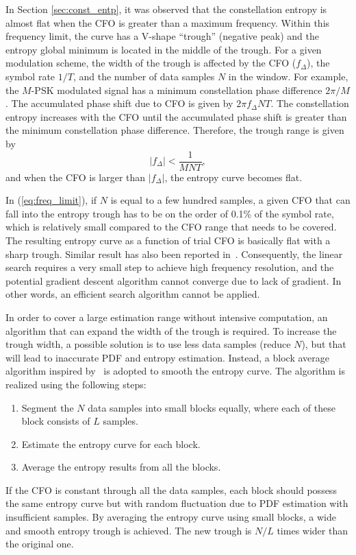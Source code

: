 \documentclass[journal,comsoc]{IEEEtran}
\begin{document}
In Section \ref{sec:const_entp}, it was observed that the constellation entropy is almost flat when the CFO is greater than a maximum frequency.
Within this frequency limit, the curve has a V-shape ``trough'' (negative peak) and the entropy global minimum is located in the middle of the trough.
For a given modulation scheme, the width of the trough is affected by the CFO ($f_\Delta$), the symbol rate $1/T$, and the number of data samples $N$ in the window.
For example, the \(M\)-PSK modulated signal has a minimum constellation phase difference \(2\pi/M\).
The accumulated phase shift due to CFO is given by \(2\pi f_\Delta N T\).
The constellation entropy increases with the CFO until the accumulated phase shift is greater than the minimum constellation phase difference. 
Therefore, the trough range is given by
\begin{equation}
\left| {f_\Delta } \right| < \frac{1}{{MNT}},
\label{eq:freq_limit}
\end{equation}
\noindent and when the CFO is larger than $\left| {f_\Delta } \right|$, the entropy curve becomes flat.


In (\ref{eq:freq_limit}), if \(N\) is equal to a few hundred samples, a given CFO that can fall into the entropy trough has to be on the order of 0.1\% of the symbol rate, which is relatively small compared to the CFO range that needs to be covered.
The resulting entropy curve as a function of trial CFO is basically flat with a sharp trough.
Similar result has also been reported in~\cite{Pedzisz2006}. 
Consequently, the linear search requires a very small step to achieve high frequency resolution, and the potential gradient descent algorithm cannot converge due to lack of gradient.
In other words, an efficient search algorithm cannot be applied. 

In order to cover a large estimation range without intensive computation, an algorithm that can expand the width of the trough is required.
To increase the trough width, a possible solution is to use less data samples (reduce \(N\)), but that will lead to inaccurate PDF and entropy estimation.
Instead, a block average algorithm inspired by~\cite{YuanlingHuang2007} is adopted to smooth the entropy curve. The algorithm is realized using the following steps:

\begin{enumerate}
\item Segment the \(N\) data samples into small blocks equally, where each of these block consists of \(L\) samples. 
\item Estimate the entropy curve for each block.
\item Average the entropy results from all the blocks.
\end{enumerate}
If the CFO is constant through all the data samples, each block should possess the same entropy curve but with random fluctuation due to PDF estimation with insufficient samples.
By averaging the entropy curve using small blocks, a wide and smooth entropy trough is achieved.
The new trough is $N/L$ times wider than the original one.
\end{document}
